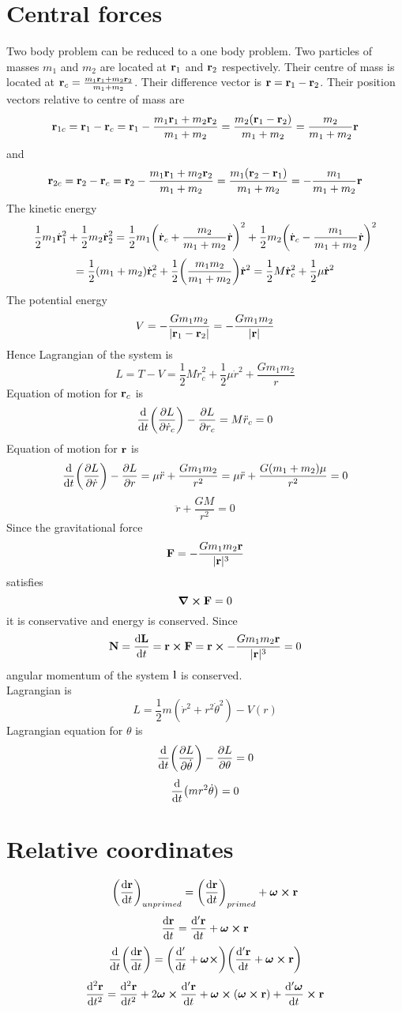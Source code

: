 \documentclass[12pt]{article}
\begin{document}
\section*{Central forces}
Two body problem can be reduced to a one body problem. Two particles of masses $m_1$ and $m_2$ are located at $\vb{r}_1$ and $\vb{r}_2$ respectively. Their centre of mass is located at $\vb{r}_c=\frac{m_1\vb{r}_1+m_2\vb{r}_2}{m_1+m_2}$. Their difference vector is $\vb{r}=\vb{r}_1-\vb{r}_2$. Their position vectors relative to centre of mass are \[\vb{r}_{1c}=\vb{r}_{1}-\vb{r}_{c}=\vb{r}_{1}-\frac{m_1\vb{r}_1+m_2\vb{r}_2}{m_1+m_2}=\frac{m_2(\vb{r}_1-\vb{r}_2)}{m_1+m_2}=\frac{m_2}{m_1+m_2}\vb{r}\] and 
\[\vb{r}_{2c}=\vb{r}_{2}-\vb{r}_{c}=\vb{r}_{2}-\frac{m_1\vb{r}_1+m_2\vb{r}_2}{m_1+m_2}=\frac{m_1(\vb{r}_2-\vb{r}_1)}{m_1+m_2}=-\frac{m_1}{m_1+m_2}\vb{r}\]
The kinetic energy \[\frac{1}{2}m_1\dot{\vb{r}}_1^2+\frac{1}{2}m_2\dot{\vb{r}}_2^2=\frac{1}{2}m_1\qty(\dot{\vb{r}}_{c}+\frac{m_2}{m_1+m_2}\dot{\vb{r}})^2+\frac{1}{2}m_2\qty(\dot{\vb{r}}_{c}-\frac{m_1}{m_1+m_2}\dot{\vb{r}})^2\]
\[=\frac{1}{2}(m_1+m_2)\dot{\vb{r}}_{c}^2+\frac{1}{2}\qty(\frac{m_1m_2}{m_1+m_2})\dot{\vb{r}}^2=\frac{1}{2}M\dot{\vb{r}}_{c}^2+\frac{1}{2}\mu\dot{\vb{r}}^2\]
The potential energy \[V=-\frac{Gm_1m_2}{|\vb{r}_1-\vb{r}_2|}=-\frac{Gm_1m_2}{|\vb{r}|}\]
Hence Lagrangian of the system is \[L=T-V=\frac{1}{2}M\dot{r}_c^2+\frac{1}{2}\mu \dot{r}^2+\frac{Gm_1m_2}{r}\]
Equation of motion for $\vb{r}_c$ is \[\dv{t}\qty(\pdv{L}{\dot{r}_c})-\pdv{L}{r_c}=M\ddot{r}_c=0\]
Equation of motion for $\vb{r}$ is \[\dv{t}\qty(\pdv{L}{\dot{r}})-\pdv{L}{r}=\mu\ddot{r}+\frac{Gm_1m_2}{r^2}=\mu\ddot{r}+\frac{G(m_1+m_2)\mu}{r^2}=0\]
\[\ddot{r}+\frac{GM}{r^2}=0\]
Since the gravitational force \[\vb{F}=-\frac{Gm_1m_2\vb{r}}{|\vb{r}|^3}\]
satisfies \[\curl{\vb{F}}=0\]
it is conservative and energy is conserved.
Since \[\vb{N}=\dv{\vb{L}}{t}=\vb{r}\cp\vb{F}=\vb{r}\cp-\frac{Gm_1m_2\vb{r}}{|\vb{r}|^3}=0\]
angular momentum of the system $\vb{l}$ is conserved.\\
Lagrangian is \[L=\frac{1}{2}m(\dot{r}^2+r^2\dot{\theta}^2)-V(r)\]
Lagrangian equation for $\theta$ is \[\dv{t}\qty(\pdv{L}{\dot{\theta}})-\pdv{L}{\theta}=0\]
\[\dv{t}\qty(mr^2\dot{\theta})=0\]
\section*{Relative coordinates}

\[\qty(\dv{\vb{r}}{t})_{un primed}=\qty(\dv{\vb{r}}{t})_{primed}+\bm{\omega}\cp\vb{r}\]
\[\dv{\vb{r}}{t}=\dv{'\vb{r}}{t}+\bm{\omega}\cp\vb{r}\]
\[\dv{t}\qty(\dv{\vb{r}}{t})=\qty(\dv{'}{t}+\bm{\omega}\cp)\qty(\dv{'\vb{r}}{t}+\bm{\omega}\cp\vb{r})\]
\[\dv[2]{\vb{r}}{t}=\dv[2]{\vb{r}}{t}+2\bm{\omega}\cp\dv{'\vb{r}}{t}+\bm{\omega}\cp(\bm{\omega}\cp\vb{r})+\dv{'\bm{\omega}}{t}\cp\vb{r}\]
\end{document}
